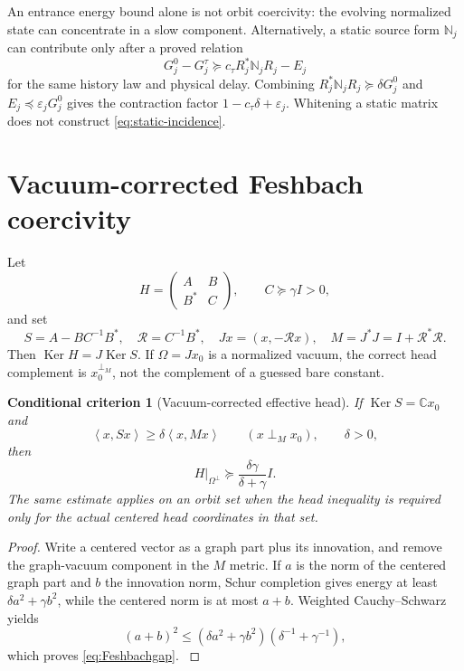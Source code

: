 \documentclass[11pt,oneside,openany]{book}
\newtheorem{criterion}[criterion]{Conditional criterion}
\theoremstyle{definition}
\theoremstyle{remark}
\newcommand{\C}{\mathbb C}
\newcommand{\Ker}{\operatorname{Ker}}
\newcommand{\ip}[2]{\left\langle#1,#2\right\rangle}
\newcommand{\src}[2]{\cite[#2]{#1}}
\begin{document}
An entrance energy bound alone is not orbit coercivity: the evolving normalized state can concentrate in a slow component. Alternatively, a static source form $\mathbb N_j$ can contribute only after a proved relation
\begin{equation}\label{eq:static-incidence}
G_j^0-G_j^\tau\succeq c_\tau R_j^*\mathbb N_jR_j-E_j
\end{equation}
for the same history law and physical delay. Combining $R_j^*\mathbb N_jR_j\succeq\delta G_j^0$ and $E_j\preceq\varepsilon_jG_j^0$ gives the contraction factor $1-c_\tau\delta+\varepsilon_j$. Whitening a static matrix does not construct \cref{eq:static-incidence}.

\section{Vacuum-corrected Feshbach coercivity}
Let
\[
H=\begin{pmatrix}A&B\\B^*&C\end{pmatrix},\qquad C\succeq\gamma I>0,
\]
and set
\begin{equation}\label{eq:Feshbach}
S=A-BC^{-1}B^*,\quad \mathcal R=C^{-1}B^*,\quad
Jx=(x,-\mathcal Rx),\quad M=J^*J=I+\mathcal R^*\mathcal R.
\end{equation}
Then $\Ker H=J\Ker S$. If $\Omega=Jx_0$ is a normalized vacuum, the correct head complement is $x_0^{\perp_M}$, not the complement of a guessed bare constant.

\begin{criterion}[Vacuum-corrected effective head]\label{thm:Feshbach}
If $\Ker S=\C x_0$ and
\[
\ip{x}{Sx}\ge\delta\ip{x}{Mx}\qquad(x\perp_Mx_0),
\qquad\delta>0,
\]
then
\begin{equation}\label{eq:Feshbachgap}
H|_{\Omega^\perp}\succeq\frac{\delta\gamma}{\delta+\gamma}I.
\end{equation}
The same estimate applies on an orbit set when the head inequality is required only for the actual centered head coordinates in that set.
\end{criterion}
\begin{proof}
Write a centered vector as a graph part plus its innovation, and remove the graph-vacuum component in the $M$ metric. If $a$ is the norm of the centered graph part and $b$ the innovation norm, Schur completion gives energy at least $\delta a^2+\gamma b^2$, while the centered norm is at most $a+b$. Weighted Cauchy--Schwarz yields
\[
(a+b)^2\le(\delta a^2+\gamma b^2)(\delta^{-1}+\gamma^{-1}),
\]
which proves \cref{eq:Feshbachgap}. \src{F1}{V3--V4}
\end{proof}
\end{document}
